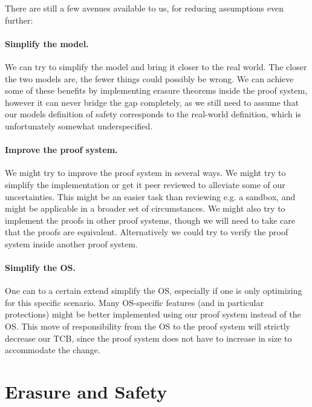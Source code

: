 There are still a few avenues available to us, for reducing assumptions even
further:

\paragraph{Simplify the model.} We can try to simplify the model and bring it
closer to the real world. The closer the two models are, the fewer things could
possibly be wrong. We can achieve some of these benefits by implementing erasure
theorems inside the proof system, however it can never bridge the gap
completely, as we still need to assume that our models definition of safety
corresponds to the real-world definition, which is unfortunately somewhat
underspecified.

\paragraph{Improve the proof system.} We might try to improve the proof system
in several ways. We might try to simplify the implementation or get it peer
reviewed to alleviate some of our uncertainties. This might be an easier task
than reviewing e.g. a sandbox, and might be applicable in a broader set of
circumstances. We might also try to implement the proofs in other proof systems,
though we will need to take care that the proofs are equivalent. Alternatively
we could try to verify the proof system inside another proof system.

\paragraph{Simplify the OS.} One can to a certain extend simplify the OS,
especially if one is only optimizing for this specific scenario. Many
OS-specific features (and in particular protections) might be better implemented
using our proof system instead of the OS. This move of responsibility from the
OS to the proof system will strictly decrease our TCB, since the proof system
does not have to increase in size to accommodate the change.

\section{Erasure and Safety}
